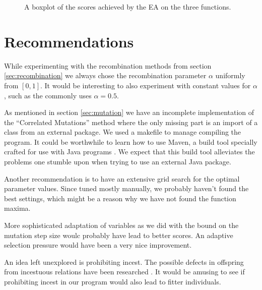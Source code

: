 \begin{figure}
\caption{A boxplot of the scores achieved by the EA on the three functions.}
\label{fig:plot}
\end{figure}

\section{Recommendations}
While experimenting with the recombination methods from section \ref{sec:recombination} we always
chose the recombination parameter $\alpha$ uniformly from $[0, 1]$. It would be interesting to also
experiment with constant values for $\alpha$, such as the commonly uses $\alpha = 0.5$.

As mentioned in section \ref{sec:mutation} we have an incomplete implementation of the ``Correlated
Mutations'' method where the only missing part is an import of a class from an external package. We
used a makefile to manage compiling the program. It could be worthwhile to learn how to use Maven, a
build tool specially crafted for use with Java programs \cite{wiki:maven}. We expect that this build
tool alleviates the problems one stumble upon when trying to use an external Java package.

Another recommendation is to have an extensive grid search for the optimal parameter values. Since
tuned mostly manually, we probably haven't found the best settings, which might be a reason why we
have not found the function maxima.

More sophisticated adaptation of variables as we did with the bound on the mutation step size woulc
probably have lead to better scores. An adaptive selection pressure would have been a very nice
improvement.

An idea left unexplored is prohibiting incest. The possible defects in offspring from incestuous
relations have been researched \cite{wiki:inbreeding}. It would be amusing to see if prohibiting
incest in our program would also lead to fitter individuals.

{\footnotesize
}

